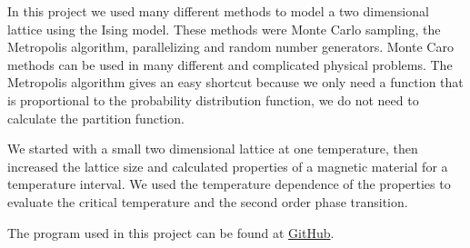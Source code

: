 In this project we used many different methods to model a two dimensional lattice using the Ising model. These methods were Monte Carlo sampling, the Metropolis algorithm, parallelizing and random number generators. Monte Caro methods can be used in many different and complicated physical problems. The Metropolis algorithm gives an easy shortcut because we only need a function that is proportional to the probability distribution function, we do not need to calculate the partition function.

We started with a small two dimensional lattice at one temperature, then increased the lattice size and calculated properties of a magnetic material for a temperature interval. We used the temperature dependence of the properties to evaluate the critical temperature and the second order phase transition.

The program used in this project can be found at \href{https://github.com/kjetka/Project4}{GitHub}.